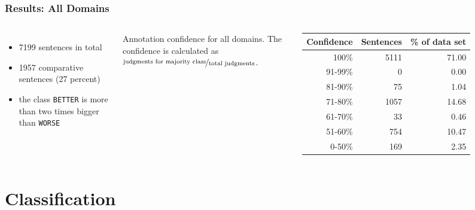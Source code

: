 \documentclass[11pt,aspectratio=169,usenames,dvipsnames]{beamer}
\begin{document}
    \begin{frame}[t]
        \frametitle{Results: All Domains}



        \begin{columns}
            \column{2in}
            \begin{itemize}
                \item 7199 sentences in total
                \item 1957 comparative sentences (27 percent)
                \item the class \texttt{BETTER} is more than two times bigger than \texttt{WORSE}
            \end{itemize}
            \column{3in}
            Annotation confidence for all domains. The confidence is calculated as $\nicefrac{\text{judgments for majority class}}{\text{total judgments}}$.
            \begin{tabular}{@{}rrr@{}}
                \toprule
                Confidence & Sentences & \% of data set \\
                \midrule
                100\%    & 5111 & 71.00     \\
                91-99\%    & 0 & 0.00     \\
                81-90\%    & 75 & 1.04     \\
                71-80\%    & 1057 & 14.68     \\
                61-70\%    & 33 & 0.46     \\
                51-60\%    & 754 & 10.47     \\
                0-50\%    & 169 & 2.35     \\
                \bottomrule
            \end{tabular}

        \end{columns}


    \end{frame}


    \section{Classification}
    \frame{\sectionpage}
    
\end{document}

